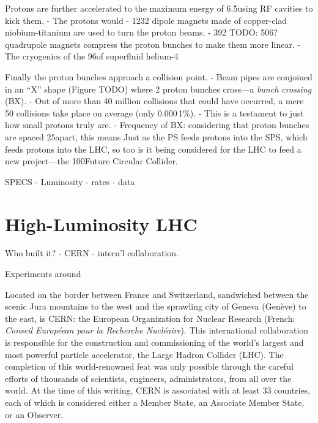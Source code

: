Protons are further accelerated to the maximum energy of 6.5\TeV using RF cavities to kick them.
- The protons would 
- 1232 dipole magnets made of copper-clad niobium-titanium are used to turn the proton beams.
- 392 TODO: 506? quadrupole magnets compress the proton bunches to make them more linear.
- The cryogenics of the 96\tonne of superfluid helium-4

Finally the proton bunches approach a collision point.
- Beam pipes are conjoined in an ``X'' shape (Figure TODO) where 2 proton bunches cross---a \emph{bunch crossing} (BX).
- Out of more than 40 million \pp collisions that could have occurred, a mere 50 collisions take place on average (\ie only 0.000\,1\%).
    - This is a testament to just how small protons truly are.
- Frequency of BX: considering that proton bunches are spaced 25\ns apart, this means 
Just as the PS feeds protons into the SPS, which feeds protons into the LHC, so too is it being considered for the LHC to feed a new project---the 100\Km Future Circular Collider.



SPECS
- Luminosity
- rates
- data

\section{High-Luminosity LHC}

Who built it?
- CERN
- intern'l collaboration.

Experiments around 







Located on the border between France and Switzerland, sandwiched between the scenic Jura mountains to the west and the sprawling city of Geneva (Genève) to the east, is CERN:
the European Organization for Nuclear Research (French: \emph{Conseil Européean pour la Recherche Nucléaire}).
This international collaboration is responsible for the construction and commissioning of the world's largest and most powerful particle accelerator, the Large Hadron Collider (LHC).
The completion of this world-renowned feat was only possible through the careful efforts of thousands of scientists, engineers, administrators, \etc from all over the world.
At the time of this writing, CERN is associated with at least 33 countries, each of which is considered either a Member State, an Associate Member State, or an Observer.

